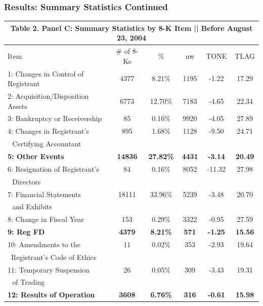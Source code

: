 \documentclass{beamer}
\begin{document}
\begin{frame}[noframenumbering]
\frametitle{Results: Summary Statistics Continued}

\begin{table}[H]   \label{T2PC}%
	\begin{center} \scriptsize
		\begin{tabular}{lccccc}
			\multicolumn{6}{c}{\textbf{Table 2. Panel C: Summary Statistics by 8-K Item || Before August 23, 2004}} \\
			\midrule
			\midrule
			Item & \multicolumn{1}{c}{\# of 8-Ks} & \multicolumn{1}{c}{\% } & \multicolumn{1}{c}{nw} & \multicolumn{1}{c}{TONE} & \multicolumn{1}{c}{TLAG} \\
			\midrule
			1: Changes in Control of Registrant & 4377 & 8.21\% & 1195 & -1.22 & 17.29 \\
			2: Acquisition/Disposition Assets& 6773 & 12.70\% & 7183 & -4.65 & 22.34 \\
			3: Bankruptcy or Receivership & 85 & 0.16\% & 9920 & -4.05 & 27.89 \\
			4: Changes in Registrant's & 895 & 1.68\% & 1128 & -9.50 & 24.71 \\
			\: \,\, Certifying Accountant & &  &  &  & \\
			\textbf{5: Other Events} & \textbf{14836} & \textbf{27.82\%} & \textbf{4431} & \textbf{-3.14} & \textbf{20.49} \\
			6: Resignation of Registrant's & 84 & 0.16\% & 8052 & -11.32 & 27.98 \\
			\: \,\, Directors & &  &  &  & \\
			7: Financial Statements & 18111 & 33.96\% & 5239 & -3.48 & 20.70 \\
			\: \,\, and Exhibits & &  &  &  & \\
			8: Change in Fiscal Year & 153 & 0.29\% & 3322 & -0.95 & 27.59 \\
			\textbf{9: Reg FD} & \textbf{4379} & \textbf{8.21\%} & \textbf{571} & \textbf{-1.25} & \textbf{15.56} \\
			10: Amendments to the & 11 & 0.02\% & 353 & -2.93 & 19.64 \\
			\quad\:\, Registrant's Code of Ethics & &  &  &  & \\
			11: Temporary Suspension & 26 & 0.05\% & 309 & -3.43 & 19.31 \\
			\: \,\, of Trading & &  &  &  & \\
			\textbf{12: Results of Operation} & \textbf{3608} & \textbf{6.76\%} & \textbf{316} & \textbf{-0.61} & \textbf{15.98} \\
			\bottomrule
			\bottomrule
		\end{tabular}%
	\end{center}
\end{table}%



\end{frame}
\end{document}
